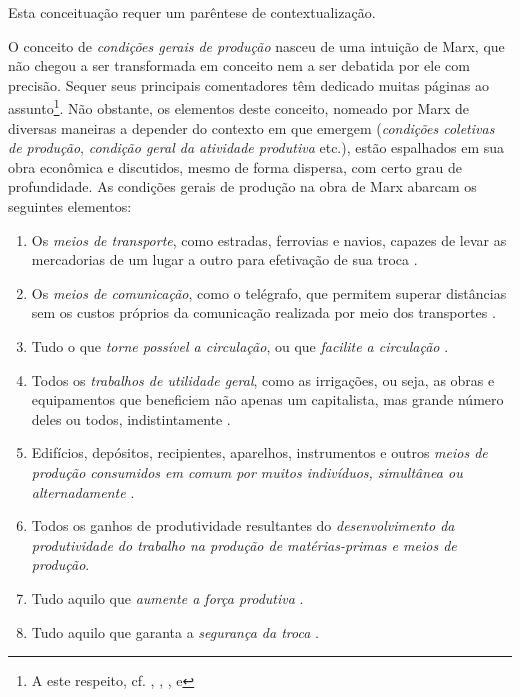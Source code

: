 Esta conceituação requer um parêntese de contextualização.

O conceito de \textit{condições gerais de produção} nasceu de uma intuição de Marx, que não chegou a ser transformada em conceito nem a ser debatida por ele com precisão. Sequer seus principais comentadores têm dedicado muitas páginas ao assunto\footnote{A este respeito, cf. , , ,  e }. Não obstante, os elementos deste conceito, nomeado por Marx de diversas maneiras a depender do contexto em que emergem (\textit{condições coletivas de produção}, \textit{condição geral da atividade produtiva} etc.), estão espalhados em sua obra econômica e discutidos, mesmo de forma dispersa, com certo grau de profundidade. As condições gerais de produção na obra de Marx abarcam os seguintes elementos:

\begin{enumerate}
\item Os \textit{meios de transporte}, como estradas, ferrovias e navios, capazes de levar as mercadorias de um lugar a outro para efetivação de sua troca \cite[p.~522]{MARX2013}.
\item Os \textit{meios de comunicação}, como o telégrafo, que permitem superar distâncias sem os custos próprios da comunicação realizada por meio dos transportes \cite[p.~457-458]{MARX2013}.
\item Tudo o que \textit{torne possível a circulação}, ou que \textit{facilite a circulação} \cite[p.~438]{MARX2011}.
\item Todos os \textit{trabalhos de utilidade geral}, como as irrigações, ou seja, as obras e equipamentos que beneficiem não apenas um capitalista, mas grande número deles ou todos, indistintamente \cite[p.~438]{MARX2011}.
\item Edifícios, depósitos, recipientes, aparelhos, instrumentos e outros \textit{meios de produção consumidos em comum por muitos indivíduos, simultânea ou alternadamente} \cite[p.~399-400]{MARX2013}.
\item Todos os ganhos de produtividade resultantes do \textit{desenvolvimento da produtividade do trabalho na produção de matérias-primas e meios de produção}.
\item Tudo aquilo que \textit{aumente a força produtiva} \cite[p.~114]{MARX2008}.
\item Tudo aquilo que garanta a \textit{segurança da troca} \cite[p.~432-433]{MARX2011}.
\end{enumerate}

